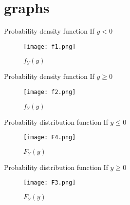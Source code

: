 \documentclass{beamer}
\begin{document}
\section{graphs}
\begin{frame}{Probability density function}
If $y<0$
    \begin{figure}[h]
    \centering
    \texttt{[image: f1.png]}
    \caption{$f_Y(y)$}
    \label{Fig 1}
    \end{figure}
\end{frame}
\begin{frame}{Probability density function}
If $y \ge 0$
    \begin{figure}[h]
    \centering
    \texttt{[image: f2.png]}
    \caption{$f_Y(y)$}
    \label{Fig 2}
    \end{figure}
\end{frame}
\begin{frame}{Probability distribution function}
If $y \leq 0$
    \begin{figure}[h]
    \centering
    \texttt{[image: F4.png]}
    \caption{$F_Y(y)$}
    \label{Fig 3}
    \end{figure}
\end{frame}
\begin{frame}{Probability distribution function}
If $y \ge 0$
    \begin{figure}[h]
    \centering
    \texttt{[image: F3.png]}
    \caption{$F_Y(y)$}
    \label{Fig 4}
    \end{figure}
\end{frame}
\end{document}
